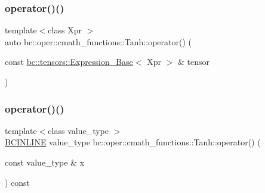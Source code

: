 \mbox{\label{structbc_1_1oper_1_1cmath__functions_1_1Tanh_a093d41d00372a0983238d6192f70b338}} 
\subsubsection{\texorpdfstring{operator()()}{operator()()}\hspace{0.1cm}{\footnotesize\ttfamily [2/3]}}
{\footnotesize\ttfamily template$<$class Xpr $>$ \\
auto bc\+::oper\+::cmath\+\_\+functions\+::\+Tanh\+::operator() (\begin{DoxyParamCaption}\item[{const \hyperlink{classbc_1_1tensors_1_1Expression__Base}{bc\+::tensors\+::\+Expression\+\_\+\+Base}$<$ Xpr $>$ \&}]{tensor }\end{DoxyParamCaption})\hspace{0.3cm}{\ttfamily [inline]}}

\mbox{\label{structbc_1_1oper_1_1cmath__functions_1_1Tanh_a0e09b9acd40cc6dffb1a3a239d8b346b}} 
\subsubsection{\texorpdfstring{operator()()}{operator()()}\hspace{0.1cm}{\footnotesize\ttfamily [3/3]}}
{\footnotesize\ttfamily template$<$class value\+\_\+type $>$ \\
\hyperlink{common_8h_a6699e8b0449da5c0fafb878e59c1d4b1}{B\+C\+I\+N\+L\+I\+NE} value\+\_\+type bc\+::oper\+::cmath\+\_\+functions\+::\+Tanh\+::operator() (\begin{DoxyParamCaption}\item[{const value\+\_\+type \&}]{x }\end{DoxyParamCaption}) const\hspace{0.3cm}{\ttfamily [inline]}}



